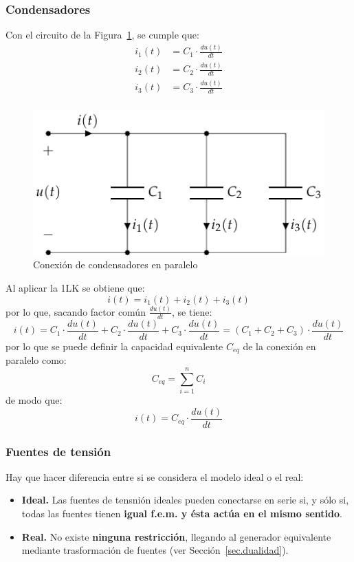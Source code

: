 \documentclass[11pt]{book} %
\begin{document}
		\subsubsection{Condensadores} 
		Con el circuito de la Figura~\ref{fig.condensadores-paralelo}, se cumple que:
		\begin{align*}
			i_1(t) &= C_1 \cdot \frac{du(t)}{dt}\\
			i_2(t) &= C_2 \cdot \frac{du(t)}{dt}\\
			i_3(t) &= C_3 \cdot \frac{du(t)}{dt}\\
		\end{align*}
		\begin{figure}[htbp]
			\centering
			\includegraphics[width=0.4\linewidth]{../figs/CondensadoresParalelo.pdf}
			\caption{Conexión de condensadores en paralelo}
			\label{fig.condensadores-paralelo}
		\end{figure}
		Al aplicar la 1LK se obtiene que: 
		\begin{equation*}
			i(t) = i_1(t) + i_2(t) + i_3(t)
		\end{equation*}
		por lo que, sacando factor común $\frac{du(t)}{dt}$, se tiene:
		\begin{equation*}
			i(t)=C_1\cdot \dfrac{du(t)}{dt}+ C_2\cdot \dfrac{du(t)}{dt}+ C_3\cdot \dfrac{du(t)}{dt}=(C_1+C_2+C_3)\cdot\dfrac{du(t)}{dt}
		\end{equation*}
		por lo que se puede definir la capacidad equivalente $C_{eq}$ de la conexión en paralelo como:
		\begin{equation}
			\boxed{C_{eq} = \sum_{i = 1}^n C_i}
		\end{equation}
		de modo que:
		\begin{equation*}
			i(t) = C_{eq} \cdot \frac{du(t)}{dt}
		\end{equation*}
		
		\subsubsection{Fuentes de tensión}
		
		Hay que hacer diferencia entre si se considera el modelo ideal o el real:
		\begin{itemize}
			\item \textbf{Ideal.} Las fuentes de tensnión ideales pueden conectarse en serie si, y sólo si, todas las fuentes tienen \textbf{igual f.e.m. y ésta actúa en el mismo sentido}.
			\item \textbf{Real.} No existe \textbf{ninguna restricción}, llegando al generador equivalente mediante trasformación de fuentes (ver Sección~\ref{sec.dualidad}). 
		\end{itemize}
		
\end{document}
